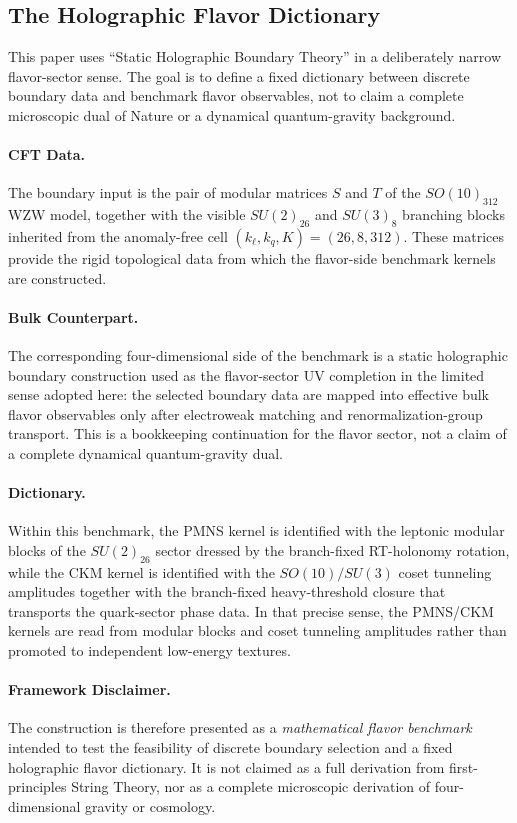 \documentclass[11pt]{article}
\begin{document}
\subsection{The Holographic Flavor Dictionary}

This paper uses ``Static Holographic Boundary Theory'' in a deliberately narrow flavor-sector sense. The goal is to define a fixed dictionary between discrete boundary data and benchmark flavor observables, not to claim a complete microscopic dual of Nature or a dynamical quantum-gravity background.

\paragraph{CFT Data.}
The boundary input is the pair of modular matrices $S$ and $T$ of the $SO(10)_{312}$ WZW model, together with the visible $SU(2)_{26}$ and $SU(3)_8$ branching blocks inherited from the anomaly-free cell $(k_{\ell},k_q,K)=(26,8,312)$. These matrices provide the rigid topological data from which the flavor-side benchmark kernels are constructed.

\paragraph{Bulk Counterpart.}
The corresponding four-dimensional side of the benchmark is a static holographic boundary construction used as the flavor-sector UV completion in the limited sense adopted here: the selected boundary data are mapped into effective bulk flavor observables only after electroweak matching and renormalization-group transport. This is a bookkeeping continuation for the flavor sector, not a claim of a complete dynamical quantum-gravity dual.

\paragraph{Dictionary.}
Within this benchmark, the PMNS kernel is identified with the leptonic modular blocks of the $SU(2)_{26}$ sector dressed by the branch-fixed RT-holonomy rotation, while the CKM kernel is identified with the $SO(10)/SU(3)$ coset tunneling amplitudes together with the branch-fixed heavy-threshold closure that transports the quark-sector phase data. In that precise sense, the PMNS/CKM kernels are read from modular blocks and coset tunneling amplitudes rather than promoted to independent low-energy textures.

\paragraph{Framework Disclaimer.}
The construction is therefore presented as a \emph{mathematical flavor benchmark} intended to test the feasibility of discrete boundary selection and a fixed holographic flavor dictionary. It is not claimed as a full derivation from first-principles String Theory, nor as a complete microscopic derivation of four-dimensional gravity or cosmology.
\end{document}
